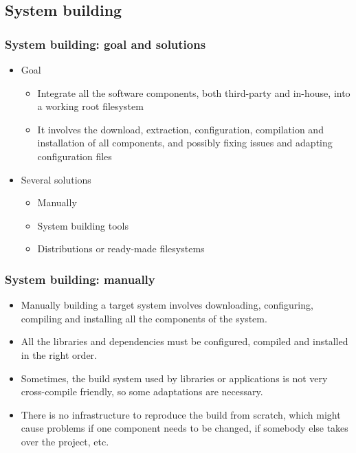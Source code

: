 \subsection{System building}

\begin{frame}
  \frametitle{System building: goal and solutions}
  \begin{itemize}
  \item Goal
    \begin{itemize}
    \item Integrate all the software components, both third-party and
      in-house, into a working root filesystem
    \item It involves the download, extraction, configuration,
      compilation and installation of all components, and possibly
      fixing issues and adapting configuration files
    \end{itemize}
  \item Several solutions
    \begin{itemize}
    \item Manually
    \item System building tools
    \item Distributions or ready-made filesystems
    \end{itemize}
  \end{itemize}
\end{frame}

\begin{frame}
  \frametitle{System building: manually}
  \begin{itemize}
  \item Manually building a target system involves downloading,
    configuring, compiling and installing all the components of the
    system.
  \item All the libraries and dependencies must be configured,
    compiled and installed in the right order.
  \item Sometimes, the build system used by libraries or applications
    is not very cross-compile friendly, so some adaptations are
    necessary.
  \item There is no infrastructure to reproduce the build from
    scratch, which might cause problems if one component needs to be
    changed, if somebody else takes over the project, etc.
  \end{itemize}
\end{frame}


